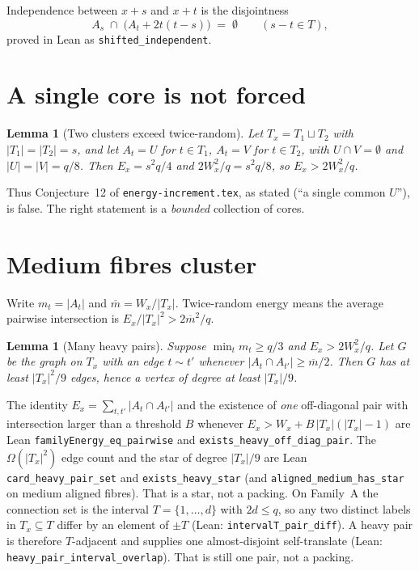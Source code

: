 \documentclass[11pt]{article}
\newtheorem{lemma}[theorem]{Lemma}
\theoremstyle{definition}
\begin{document}
Independence between $x+s$ and $x+t$ is the disjointness
\begin{equation}\label{eq:shift}
  A_s\;\cap\;\bigl(A_t+2t(t-s)\bigr)\;=\;\emptyset
  \qquad(s-t\in T),
\end{equation}
proved in Lean as \texttt{shifted\_independent}.

\section{A single core is not forced}

\begin{lemma}[Two clusters exceed twice-random]\label{lem:twoclust}
Let $T_x=T_1\sqcup T_2$ with $|T_1|=|T_2|=s$, and let $A_t=U$ for $t\in T_1$, $A_t=V$ for $t\in T_2$, with $U\cap V=\emptyset$ and $|U|=|V|=q/8$.
Then $E_x=s^{2}q/4$ and $2W_x^{2}/q=s^{2}q/8$, so $E_x>2W_x^{2}/q$.
\end{lemma}

Thus Conjecture~12 of \texttt{energy-increment.tex}, as stated (``a single common $U$''), is false.
The right statement is a \emph{bounded} collection of cores.

\section{Medium fibres cluster}

Write $m_t=|A_t|$ and $\overline m=W_x/|T_x|$.
Twice-random energy means the average pairwise intersection is $E_x/|T_x|^{2}>2\overline m^{2}/q$.

\begin{lemma}[Many heavy pairs]\label{lem:heavypairs}
Suppose $\min_t m_t\ge q/3$ and $E_x>2W_x^{2}/q$.
Let $G$ be the graph on $T_x$ with an edge $t\sim t'$ whenever $|A_t\cap A_{t'}|\ge \overline m/2$.
Then $G$ has at least $|T_x|^{2}/9$ edges, hence a vertex of degree at least $|T_x|/9$.
\end{lemma}

The identity $E_x=\sum_{t,t'}|A_t\cap A_{t'}|$ and the existence of
\emph{one} off-diagonal pair with intersection larger than a threshold $B$
whenever $E_x>W_x+B\,|T_x|(|T_x|-1)$ are Lean
\texttt{familyEnergy\_eq\_pairwise} and
\texttt{exists\_heavy\_off\_diag\_pair}.
The $\Omega(|T_x|^{2})$ edge count and the star of degree $|T_x|/9$
are Lean \texttt{card\_heavy\_pair\_set} and
\texttt{exists\_heavy\_star} (and
\texttt{aligned\_medium\_has\_star} on medium aligned fibres).
That is a star, not a packing.
On Family~A the connection set is the interval $T=\{1,\dots,d\}$ with
$2d\le q$, so any two distinct labels in $T_x\subseteq T$ differ by an
element of $\pm T$ (Lean: \texttt{intervalT\_pair\_diff}).
A heavy pair is therefore $T$-adjacent and supplies one almost-disjoint
self-translate (Lean: \texttt{heavy\_pair\_interval\_overlap}).
That is still one pair, not a packing.
\end{document}
